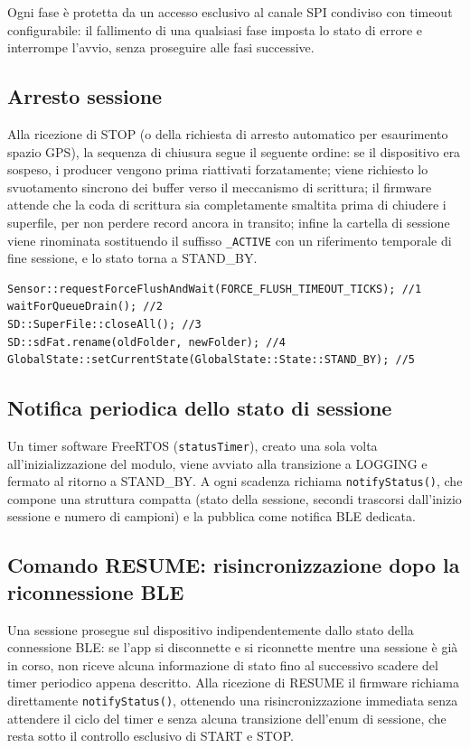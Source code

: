 Ogni fase è protetta da un accesso esclusivo al canale SPI condiviso con
timeout configurabile: il fallimento di una qualsiasi fase imposta lo stato
di errore e interrompe l'avvio, senza proseguire alle fasi successive.

\subsection{Arresto sessione}
Alla ricezione di STOP (o della richiesta di arresto automatico per
esaurimento spazio GPS), la sequenza di chiusura
segue il seguente ordine: se il dispositivo era sospeso, i
producer vengono prima riattivati forzatamente; viene richiesto lo
svuotamento sincrono dei buffer verso il meccanismo di scrittura; il firmware 
attende che la coda di scrittura sia completamente
smaltita prima di chiudere i superfile, per non perdere record ancora in
transito; infine la cartella di sessione viene rinominata sostituendo il
suffisso \texttt{\_ACTIVE} con un riferimento temporale di fine sessione, e lo
stato torna a STAND\_BY.

\begin{listing}[H]
\begin{verbatim}
Sensor::requestForceFlushAndWait(FORCE_FLUSH_TIMEOUT_TICKS); //1
waitForQueueDrain(); //2
SD::SuperFile::closeAll(); //3
SD::sdFat.rename(oldFolder, newFolder); //4
GlobalState::setCurrentState(GlobalState::State::STAND_BY); //5
\end{verbatim}
\caption{Sequenza di arresto sessione (semplificata)}
\label{listing:session-stop}
\end{listing}

\subsection{Notifica periodica dello stato di sessione}
Un timer software FreeRTOS (\texttt{statusTimer}), creato una sola volta all'inizializzazione 
del modulo, viene avviato alla transizione a LOGGING e fermato al ritorno a STAND\_BY. A ogni 
scadenza richiama \texttt{notifyStatus()}, che compone una struttura compatta (stato della sessione, 
secondi trascorsi dall'inizio sessione e numero di campioni) e la pubblica come notifica BLE dedicata.

\subsection{Comando RESUME: risincronizzazione dopo la riconnessione BLE}
Una sessione prosegue sul dispositivo indipendentemente dallo stato della connessione 
BLE: se l'app si disconnette e si riconnette mentre una sessione è già in corso, non 
riceve alcuna informazione di stato fino al successivo scadere del timer periodico 
appena descritto. Alla ricezione di RESUME il firmware richiama direttamente 
\texttt{notifyStatus()}, ottenendo una risincronizzazione immediata senza attendere 
il ciclo del timer e senza alcuna transizione dell'enum di sessione, che resta sotto 
il controllo esclusivo di START e STOP.

